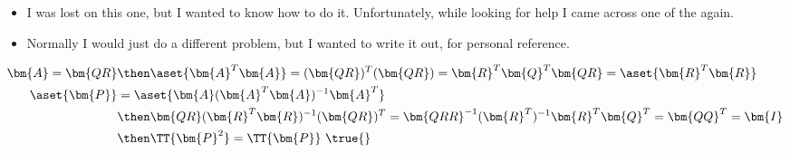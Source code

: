 \begin{itemize}
\begin{enumerate}
    \begin{itemize}
      \item I was lost on this one, but I wanted to know how to do it.
        Unfortunately, while looking for help I came across one of the again.
      \item Normally I would just do a different problem, but I wanted to write
        it out, for personal reference.
    \end{itemize}
    \begin{align*}
      \bm{A} = \bm{QR} &\then \aset{\bm{A}^T  \bm{A}} = (\bm{QR})^T (\bm{QR}) = \bm{R}^T \bm{Q}^T \bm{QR} = \aset{\bm{R}^T \bm{R}} \\
      \aset{\bm{P}} &= \aset{\bm{A}(\bm{A}^T \bm{A})^{-1} \bm{A}^T } \\
             &\then
             \bm{QR}(\bm{R}^T \bm{R})^{-1} (\bm{QR})^T = \bm{QRR}^{-1}(\bm{R}^T )^{-1} \bm{R}^T \bm{Q}^T = \bm{QQ}^T = \bm{I} \\
             &\then \TT{\bm{P}^2} = \TT{\bm{P}}~\text{\true{}}
    \end{align*}

  \end{enumerate}
\end{itemize}

